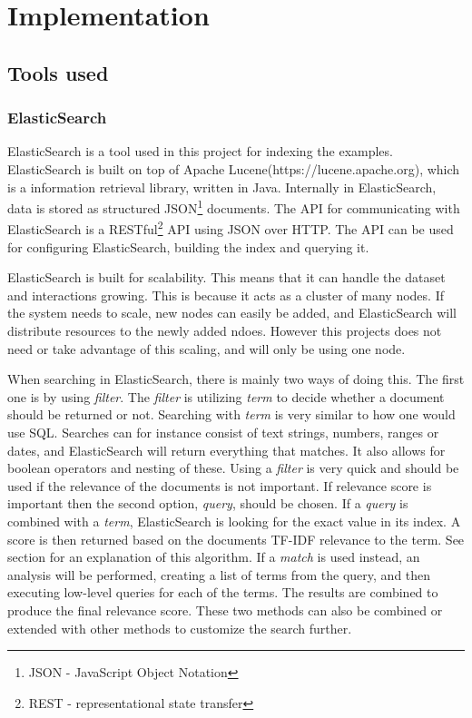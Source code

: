 
\chapter{Implementation}\label{cap_4}

\section{Tools used}

\subsection{ElasticSearch} \label{elasticsearch}
ElasticSearch is a tool used in this project for indexing the examples. ElasticSearch is built on top of Apache Lucene(https://lucene.apache.org), which is a information retrieval library, written in Java. Internally in ElasticSearch, data is stored as structured JSON\footnote{JSON - JavaScript Object Notation} documents. The API for communicating with ElasticSearch is a RESTful\footnote{REST - representational state transfer} API using JSON over HTTP. The API can be used for configuring ElasticSearch, building the index and querying it. 

ElasticSearch is built for scalability. This means that it can handle the dataset and interactions growing. This is because it acts as a cluster of many nodes. If the system needs to scale, new nodes can easily be added, and ElasticSearch will distribute resources to the newly added ndoes. However this projects does not need or take advantage of this scaling, and will only be using one node.

When searching in ElasticSearch, there is mainly two ways of doing this. The first one is by using \textit{filter}. The \textit{filter} is utilizing \textit{term} to decide whether a document should be returned or not. Searching with \textit{term} is very similar to how one would use SQL. %
Searches can for instance consist of text strings, numbers, ranges or dates, and ElasticSearch will return everything that matches. It also allows for boolean operators and nesting of these. Using a \textit{filter} is very quick and should be used if the relevance of the documents is not important. If relevance score is important then the second option, \textit{query}, should be chosen. If a \textit{query} is combined with a \textit{term}, ElasticSearch is looking for the exact value in its index. A score is then returned based on the documents TF-IDF relevance to the term. See section \label{tfidf} for an explanation of this algorithm.%
If a \textit{match} is used instead, an analysis will be performed, creating a list of terms from the query, and then executing low-level queries for each of the terms. The results are combined to produce the final relevance score. These two methods can also be combined or extended with other methods to customize the search further.


